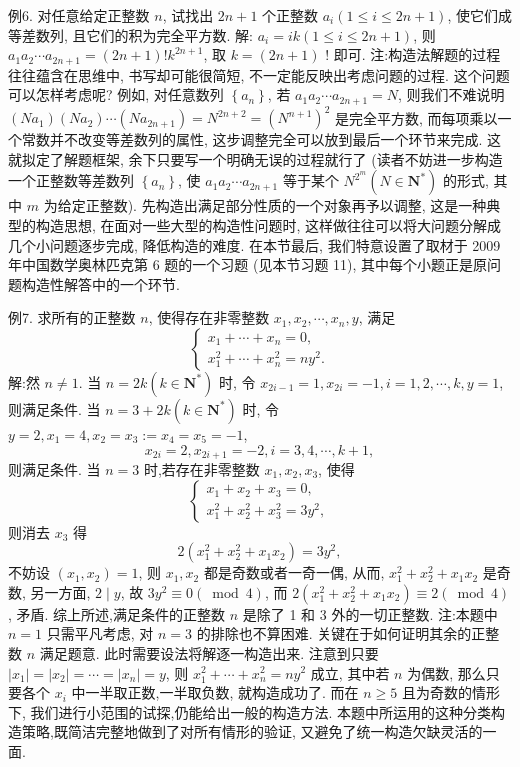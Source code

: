 例6. 对任意给定正整数 $n$, 试找出 $2 n+1$ 个正整数 $a_i(1 \leqslant i \leqslant 2 n+1)$, 使它们成等差数列, 且它们的积为完全平方数.
解: $a_i=i k(1 \leqslant i \leqslant 2 n+1)$, 则 $a_1 a_2 \cdots a_{2 n+1}=(2 n+1) ! k^{2 n+1}$, 取 $k= (2 n+1)$ ! 即可.
注:构造法解题的过程往往蕴含在思维中, 书写却可能很简短, 不一定能反映出考虑问题的过程.
这个问题可以怎样考虑呢? 例如, 对任意数列 $\left\{a_n\right\}$, 若 $a_1 a_2 \cdots a_{2 n+1}=N$, 则我们不难说明 $\left(N a_1\right)\left(N a_2\right) \cdots\left(N a_{2 n+1}\right)=N^{2 n+2}=\left(N^{n+1}\right)^2$ 是完全平方数, 而每项乘以一个常数并不改变等差数列的属性, 这步调整完全可以放到最后一个环节来完成.
这就拟定了解题框架, 余下只要写一个明确无误的过程就行了 (读者不妨进一步构造一个正整数等差数列 $\left\{a_n\right\}$, 使 $a_1 a_2 \cdots a_{2 n+1}$ 等于某个 $N^{2^m}\left(N \in \mathbf{N}^*\right)$ 的形式, 其中 $m$ 为给定正整数).
先构造出满足部分性质的一个对象再予以调整, 这是一种典型的构造思想, 在面对一些大型的构造性问题时, 这样做往往可以将大问题分解成几个小问题逐步完成, 降低构造的难度.
在本节最后, 我们特意设置了取材于 2009 年中国数学奥林匹克第 6 题的一个习题 (见本节习题 11), 其中每个小题正是原问题构造性解答中的一个环节.



例7. 求所有的正整数 $n$, 使得存在非零整数 $x_1, x_2, \cdots, x_n, y$, 满足
$$
\left\{\begin{array}{l}
x_1+\cdots+x_n=0, \\
x_1^2+\cdots+x_n^2=n y^2 .
\end{array}\right.
$$
解:然 $n \neq 1$.
当 $n=2 k\left(k \in \mathbf{N}^*\right)$ 时, 令 $x_{2 i-1}=1, x_{2 i}=-1, i=1,2, \cdots, k, y=1$, 则满足条件.
当 $n=3+2 k\left(k \in \mathbf{N}^*\right)$ 时, 令 $y=2, x_1=4, x_2=x_3:=x_4=x_5=-1$,
$$
x_{2 i}=2, x_{2 i+1}=-2, i=3,4, \cdots, k+1,
$$
则满足条件.
当 $n=3$ 时,若存在非零整数 $x_1, x_2, x_3$, 使得
$$
\left\{\begin{array}{l}
x_1+x_2+x_3=0, \\
x_1^2+x_2^2+x_3^2=3 y^2,
\end{array}\right.
$$
则消去 $x_3$ 得
$$
2\left(x_1^2+x_2^2+x_1 x_2\right)=3 y^2,
$$
不妨设 $\left(x_1, x_2\right)=1$, 则 $x_1, x_2$ 都是奇数或者一奇一偶, 从而, $x_1^2+x_2^2+x_1 x_2$ 是奇数, 另一方面, $2 \mid y$, 故 $3 y^2 \equiv 0(\bmod 4)$, 而 $2\left(x_1^2+x_2^2+x_1 x_2\right) \equiv 2(\bmod 4)$, 矛盾.
综上所述,满足条件的正整数 $n$ 是除了 1 和 3 外的一切正整数.
注:本题中 $n=1$ 只需平凡考虑, 对 $n=3$ 的排除也不算困难.
关键在于如何证明其余的正整数 $n$ 满足题意.
此时需要设法将解逐一构造出来.
注意到只要 $\left|x_1\right|=\left|x_2\right|=\cdots=\left|x_n\right|=y$, 则 $x_1^2+\cdots+x_n^2=n y^2$ 成立, 其中若 $n$ 为偶数, 那么只要各个 $x_i$ 中一半取正数,一半取负数, 就构造成功了.
而在 $n \geqslant 5$ 且为奇数的情形下, 我们进行小范围的试探,仍能给出一般的构造方法.
本题中所运用的这种分类构造策略,既简洁完整地做到了对所有情形的验证, 又避免了统一构造欠缺灵活的一面.



